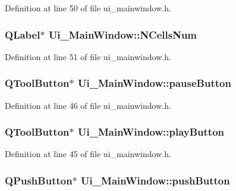 \-Definition at line 50 of file ui\-\_\-mainwindow.\-h.

\hypertarget{class_ui___main_window_a4f203fa20746d2f27d346c96a5ab9dd6}{
\subsubsection[{\-N\-Cells\-Num}]{\setlength{\rightskip}{0pt plus 5cm}\-Q\-Label$\ast$ {\bf \-Ui\-\_\-\-Main\-Window\-::\-N\-Cells\-Num}}}\label{class_ui___main_window_a4f203fa20746d2f27d346c96a5ab9dd6}


\-Definition at line 51 of file ui\-\_\-mainwindow.\-h.

\hypertarget{class_ui___main_window_adf0fe1ee3ae6e5766589c477c85ac16c}{
\subsubsection[{pause\-Button}]{\setlength{\rightskip}{0pt plus 5cm}\-Q\-Tool\-Button$\ast$ {\bf \-Ui\-\_\-\-Main\-Window\-::pause\-Button}}}\label{class_ui___main_window_adf0fe1ee3ae6e5766589c477c85ac16c}


\-Definition at line 46 of file ui\-\_\-mainwindow.\-h.

\hypertarget{class_ui___main_window_a9b4aced7d5563bf1ee62d944215a9a92}{
\subsubsection[{play\-Button}]{\setlength{\rightskip}{0pt plus 5cm}\-Q\-Tool\-Button$\ast$ {\bf \-Ui\-\_\-\-Main\-Window\-::play\-Button}}}\label{class_ui___main_window_a9b4aced7d5563bf1ee62d944215a9a92}


\-Definition at line 45 of file ui\-\_\-mainwindow.\-h.

\hypertarget{class_ui___main_window_ad332d93084584930878f1daf5f84cdbf}{
\subsubsection[{push\-Button}]{\setlength{\rightskip}{0pt plus 5cm}\-Q\-Push\-Button$\ast$ {\bf \-Ui\-\_\-\-Main\-Window\-::push\-Button}}}\label{class_ui___main_window_ad332d93084584930878f1daf5f84cdbf}


